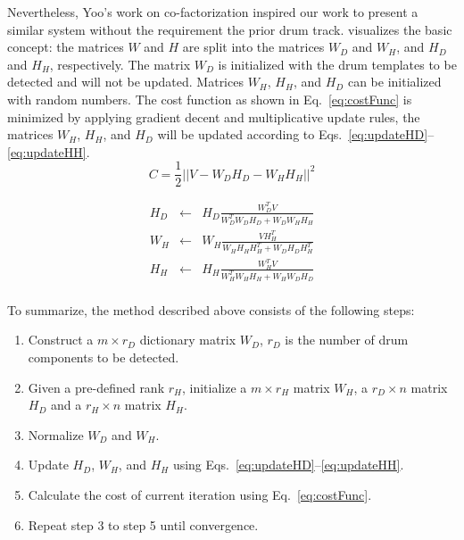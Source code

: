\documentclass{article}
\begin{document}
Nevertheless, Yoo's work on co-factorization inspired our work to present a similar system without the requirement the prior drum track.  visualizes the basic concept: the matrices $W$ and $H$ are split into the  matrices $W_D$ and $W_H$, and  $H_D$ and $H_H$, respectively. 
The matrix $W_D$ is initialized with the drum templates to be detected and will not be updated. Matrices $W_H$, $H_H$, and $H_D$ can be initialized with random numbers. 
The cost function as shown in Eq.~\eqref{eq:costFunc} is minimized by applying gradient decent and multiplicative update rules, the matrices  $W_H$, $H_H$, and $H_D$ will be updated according to Eqs.~\eqref{eq:updateHD}--\eqref{eq:updateHH}.  %
\begin{equation}
C = \frac{1}{2} || V - W_{D}H_{D} - W_{H}H_{H}||^{2}
\label{eq:costFunc}
\end{equation}

\begin{eqnarray}\label{eq1}
H_{D} &\leftarrow& H_{D}\frac{W_{D} ^T V}{W_{D}^T W_{D} H_{D} + W_{D} W_{H} H_{H}}\\
\label{eq:updateHD}
%
W_{H} &\leftarrow& W_{H}\frac{V H_{H}^T}{W_{H} H_{H} H_{H}^T + W_{D} H_{D} H_{H}^T}\\
\label{eq:updateWH}
%
H_{H} &\leftarrow& H_{H}\frac{W_{H}^T V}{W_{H}^T W_{H} H_{H} + W_{H} W_{D} H_{D}}
\label{eq:updateHH}
\end{eqnarray}\\


To summarize, the method described above consists of the following steps:
\begin{enumerate}
    \item   Construct a $m \times r_D$ dictionary matrix $W_D$, $r_D$ is the number of drum components to be detected.
    \item   Given a pre-defined rank $r_H$, initialize a $m \times r_H$ matrix $W_H$, a $r_D \times n$ matrix $H_D$ and a $r_H \times n$ matrix $H_H$.
    \item   Normalize $W_D$ and $W_H$. 
    \item   Update $H_D$, $W_H$, and $H_H$ using Eqs.~\eqref{eq:updateHD}--\eqref{eq:updateHH}.
    \item   Calculate the cost of current iteration using Eq.~\eqref{eq:costFunc}.
    \item   Repeat step 3 to step 5 until convergence.
\end{enumerate}
\end{document}
